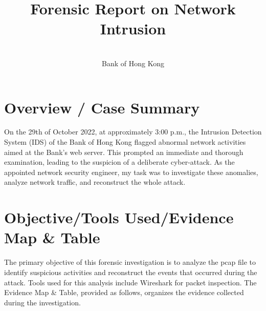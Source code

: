 \documentclass{article}
\title{\fontsize{16pt}{19pt}\selectfont\textbf{Forensic Report on Network Intrusion}}
\author{\fontsize{12pt}{14pt}\selectfont [Your Name] \\ Bank of Hong Kong}
\date{\fontsize{12pt}{14pt}\selectfont [Date of the Report]}
\begin{document}
    \maketitle

    \section{\fontsize{14pt}{17pt}\selectfont Overview / Case Summary}\label{sec:selectfont-overview-/-case-summary}
    On the 29th of October 2022, at approximately 3:00 p.m.,
    the Intrusion Detection System (IDS) of the Bank of Hong Kong flagged abnormal network activities aimed at the Bank's web server.
    This prompted an immediate and thorough examination,
    leading to the suspicion of a deliberate cyber-attack.
    As the appointed network security engineer, my task was to investigate these anomalies,
    analyze network traffic, and reconstruct the whole attack.

    \section{\fontsize{14pt}{17pt}\selectfont Objective/Tools Used/Evidence Map \& Table}\label{sec:selectfont-objective/tools-used/evidence-map-&-table}
    The primary objective of this forensic investigation is to analyze the pcap file to identify suspicious activities
    and reconstruct the events that occurred during the attack.
    Tools used for this analysis include Wireshark for packet inspection.
    The Evidence Map \& Table, provided as follows, organizes the evidence collected during the investigation.
\end{document}
